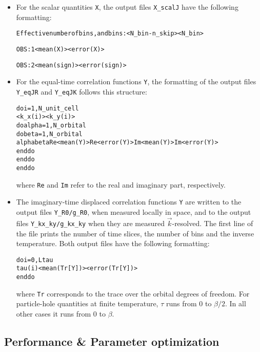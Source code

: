 \begin{itemize}
	\item For the scalar quantities \texttt{X}, the output files  \texttt{X\_scalJ} have the following formatting:
	\begin{alltt}
		Effective number of bins, and bins:           <N_bin - n_skip>          <N_bin>
		
		OBS :    1      <mean(X)>      <error(X)>
		
		OBS :    2      <mean(sign)>   <error(sign)>
	\end{alltt}
	
	\item For the equal-time correlation functions \texttt{Y}, the formatting of the output files \texttt{Y\_eqJR} and \texttt{Y\_eqJK} follows this structure:
	\begin{alltt}
		do i = 1, N_unit_cell
		<k_x(i)>   <k_y(i)>
		do alpha = 1, N_orbital
		do beta  = 1, N_orbital
		alpha   beta   Re<mean(Y)>   Re<error(Y)>   Im<mean(Y)>   Im<error(Y)>
		enddo
		enddo
		enddo
	\end{alltt}
	where \texttt{Re} and \texttt{Im} refer to the real and imaginary part, respectively.
	
	\item The imaginary-time displaced correlation functions \texttt{Y} are written to the output files \texttt{Y\_R0/g\_R0}, when measured locally in space, 
	and to the output files \texttt{Y\_kx\_ky/g\_kx\_ky} when they are measured $\vec{k}$-resolved.    The first line of the  file prints the number of time slices, 
	the number of bins and the inverse temperature. 
	Both output files have the following formatting:
	\begin{alltt}
		do i = 0, Ltau
		tau(i)   <mean( Tr[Y] )>   <error( Tr[Y])>
		enddo
	\end{alltt}
	where \texttt{Tr} corresponds to the trace over the orbital degrees of freedom.   For particle-hole quantities at finite temperature,  $\tau$ runs from 
	$0$ to $\beta/2$.   In all other cases it runs from $0$ to $\beta$. 
	
	
\end{itemize}



%
\subsection{Performance \& Parameter optimization} \label{sec:optimize}
%


